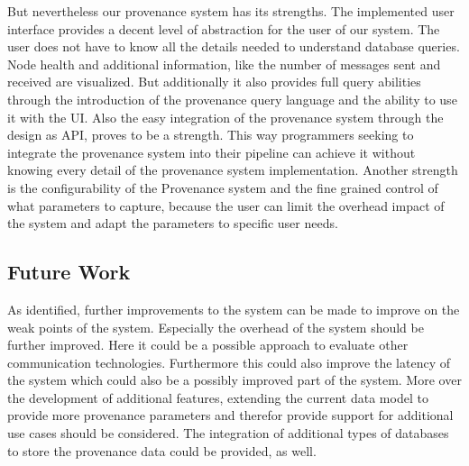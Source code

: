 But nevertheless our provenance system has its strengths. 
The implemented user interface provides a decent level of abstraction for the user of our system. The user does not have to know all the details needed to understand database queries. Node health and additional information, like the number of messages sent and received are visualized. But additionally it also provides full query abilities through the introduction of the provenance query language and the ability to use it with the UI. Also the easy integration of the provenance system through the design as API, proves to be a strength. This way programmers seeking to integrate the provenance system into their pipeline can achieve it without knowing every detail of the provenance system implementation. Another strength is the configurability of the Provenance system and the fine grained control of what parameters to capture, because the user can limit the overhead impact of the system and adapt the parameters to specific user needs.

\subsection{Future Work}
As identified, further improvements to the system can be made to improve on the weak points of the system. Especially the overhead of the system should be further improved. Here it could be a possible approach to evaluate other communication technologies. Furthermore this could also improve the latency of the system which could also be a possibly improved part of the system. More over the development of additional features, extending the current data model to provide more provenance parameters and therefor provide support for additional use cases should be considered. The integration of additional types of databases to store the provenance data could be provided, as well. 


